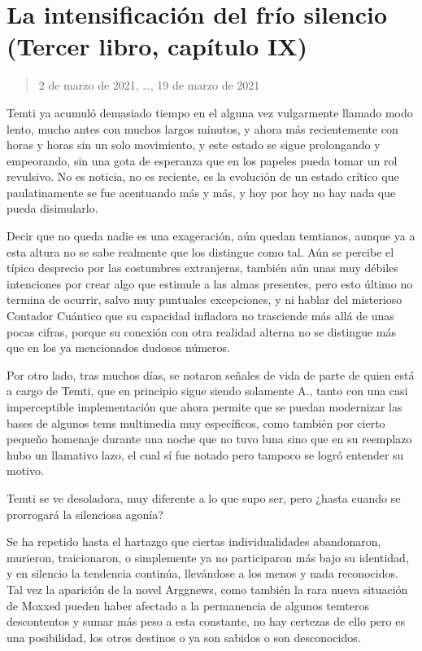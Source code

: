 \documentclass[
  spanish,
]{book}
\begin{document}
\hypertarget{la-intensificaciuxf3n-del-fruxedo-silencio-tercer-libro-capuxedtulo-ix}{%
\section{La intensificación del frío silencio (Tercer libro, capítulo IX)}\label{la-intensificaciuxf3n-del-fruxedo-silencio-tercer-libro-capuxedtulo-ix}}

\begin{quote}
2 de marzo de 2021, \ldots, 19 de marzo de 2021
\end{quote}

Temti ya acumuló demasiado tiempo en el alguna vez vulgarmente llamado modo lento, mucho antes con muchos largos minutos, y ahora más recientemente con horas y horas sin un solo movimiento, y este estado se sigue prolongando y empeorando, sin una gota de esperanza que en los papeles pueda tomar un rol revulsivo. No es noticia, no es reciente, es la evolución de un estado crítico que paulatinamente se fue acentuando más y más, y hoy por hoy no hay nada que pueda disimularlo.

Decir que no queda nadie es una exageración, aún quedan temtianos, aunque ya a esta altura no se sabe realmente que los distingue como tal. Aún se percibe el típico desprecio por las costumbres extranjeras, también aún unas muy débiles intenciones por crear algo que estimule a las almas presentes, pero esto último no termina de ocurrir, salvo muy puntuales excepciones, y ni hablar del misterioso Contador Cuántico que su capacidad infladora no trasciende más allá de unas pocas cifras, porque su conexión con otra realidad alterna no se distingue más que en los ya mencionados dudosos números.

Por otro lado, tras muchos días, se notaron señales de vida de parte de quien está a cargo de Temti, que en principio sigue siendo solamente A., tanto con una casi imperceptible implementación que ahora permite que se puedan modernizar las bases de algunos tems multimedia muy específicos, como también por cierto pequeño homenaje durante una noche que no tuvo luna sino que en su reemplazo hubo un llamativo lazo, el cual sí fue notado pero tampoco se logró entender su motivo.

Temti se ve desoladora, muy diferente a lo que supo ser, pero ¿hasta cuando se prorrogará la silenciosa agonía?

Se ha repetido hasta el hartazgo que ciertas individualidades abandonaron, murieron, traicionaron, o simplemente ya no participaron más bajo su identidad, y en silencio la tendencia continúa, llevándose a los menos y nada reconocidos.
Tal vez la aparición de la novel Arggnews, como también la rara nueva situación de Moxxed pueden haber afectado a la permanencia de algunos temteros descontentos y sumar más peso a esta constante, no hay certezas de ello pero es una posibilidad, los otros destinos o ya son sabidos o son desconocidos.
\end{document}
